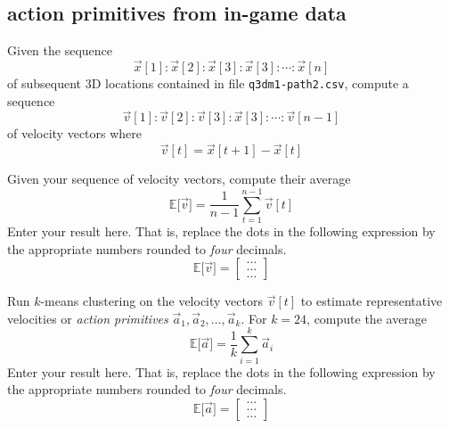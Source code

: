 
\color{black}
\subsection*{action primitives from in-game data}

Given the sequence
\begin{equation*}
\vec{x}[1]:\vec{x}[2]:\vec{x}[3]:\vec{x}[3]:\cdots:\vec{x}[n]
\end{equation*}
of subsequent 3D locations contained in file \texttt{q3dm1-path2.csv}, compute a sequence
\begin{equation*}
\vec{v}[1]:\vec{v}[2]:\vec{v}[3]:\vec{x}[3]:\cdots:\vec{v}[n-1]
\end{equation*}
of velocity vectors where 
\begin{equation*}
\vec{v}[t] = \vec{x}[t+1] - \vec{x}[t]
\end{equation*}





\vspace{2cm}
Given your sequence of velocity vectors, compute their average
\begin{equation*}
\mathbb{E} \bigl[ \vec{v} \bigr] = \frac{1}{n-1} \sum_{t=1}^{n-1} \vec{v}[t]
\end{equation*}
Enter your result here. That is, replace the dots in the following expression by the appropriate numbers rounded to \emph{four} decimals. \color{blue}
\begin{equation*}
\mathbb{E} \bigl[ \vec{v} \bigr] = \begin{bmatrix} \ldots \\ \ldots \\ \ldots \end{bmatrix}
\end{equation*}
\color{black}





\vspace{2cm}
Run $k$-means clustering on the velocity vectors $\vec{v}[t]$ to estimate representative velocities or \emph{action primitives} $\vec{a}_1, \vec{a}_2, \ldots, \vec{a}_k$. For $k=24$, compute the average
\begin{equation*}
\mathbb{E} \bigl[ \vec{a} \bigr] = \frac{1}{k} \sum_{i=1}^{k} \vec{a}_i
\end{equation*}
Enter your result here. That is, replace the dots in the following expression by the appropriate numbers rounded to \emph{four} decimals. \color{blue}
\begin{equation*}
\mathbb{E} \bigl[ \vec{a} \bigr] = \begin{bmatrix} \ldots \\ \ldots \\ \ldots \end{bmatrix}
\end{equation*}
\color{black}